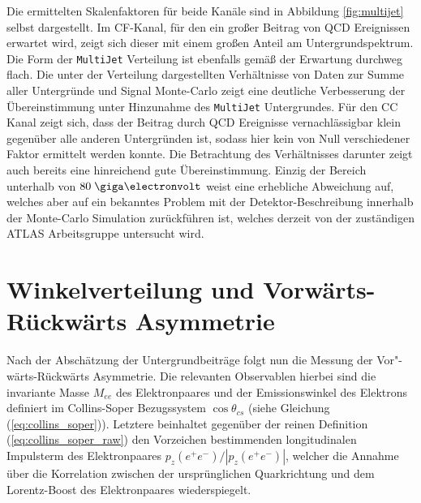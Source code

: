 Die ermittelten Skalenfaktoren für beide Kanäle sind in Abbildung
\ref{fig:multijet} selbst dargestellt. Im \ac{CF}-Kanal, für den ein großer
Beitrag von \ac{QCD} Ereignissen erwartet wird, zeigt sich dieser mit einem
großen Anteil am Untergrundspektrum. Die Form der \texttt{MultiJet} Verteilung
ist ebenfalls gemäß der Erwartung durchweg flach. Die unter der Verteilung
dargestellten Verhältnisse von Daten zur Summe aller Untergründe und
Signal Monte-Carlo zeigt eine deutliche Verbesserung der Übereinstimmung unter
Hinzunahme des \texttt{MultiJet} Untergrundes. Für den \ac{CC} Kanal zeigt
sich, dass der Beitrag durch \ac{QCD} Ereignisse vernachlässigbar klein
gegenüber alle anderen Untergründen ist, sodass hier kein von Null
verschiedener Faktor ermittelt werden konnte. Die Betrachtung des Verhältnisses
darunter zeigt auch bereits eine hinreichend gute Übereinstimmung.  Einzig der
Bereich unterhalb von $80\GeV$ weist eine erhebliche Abweichung auf, welches
aber auf ein bekanntes Problem mit der Detektor-Beschreibung innerhalb der
Monte-Carlo Simulation zurückführen ist, welches derzeit von der zuständigen
ATLAS Arbeitsgruppe untersucht wird.



\section{Winkelverteilung und Vorwärts-Rückwärts Asymmetrie}
\label{afb:afb}


Nach der Abschätzung der Untergrundbeiträge folgt nun die Messung der
Vor"-wärts-Rückwärts Asymmetrie. Die relevanten Observablen hierbei sind die
invariante Masse $M_{ee}$ des Elektronpaares und der Emissionswinkel des
Elektrons definiert im Collins-Soper Bezugssystem $\cos\theta_{cs}$ (siehe
Gleichung (\ref{eq:collins_soper})). Letztere beinhaltet gegenüber der reinen
Definition (\ref{eq:collins_soper_raw}) den Vorzeichen bestimmenden
longitudinalen Impulsterm des Elektronpaares $p_z(e^+e^-)/|p_z(e^+e^-)|$,
welcher die Annahme über die Korrelation zwischen der ursprünglichen
Quarkrichtung und dem Lorentz-Boost des Elektronpaares wiederspiegelt. 




